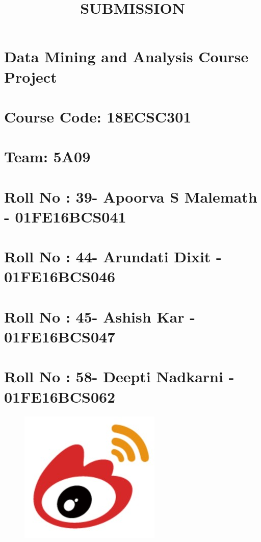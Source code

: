 \documentclass[11pt]{article}
\title{SUBMISSION}
\makeatletter
\def\maxwidth{\ifdim\Gin@nat@width>\linewidth\linewidth
    \else\Gin@nat@width\fi}
\let\Oldincludegraphics\includegraphics
\renewcommand{\includegraphics}[1]{\Oldincludegraphics[width=.8\maxwidth]{#1}}
\makeatother
\begin{document}
    
    
    \maketitle
    
    

    
    \section{Data Mining and Analysis Course
Project}\label{data-mining-and-analysis-course-project}

\section{Course Code: 18ECSC301}\label{course-code-18ecsc301}

\section{Team: 5A09}\label{team-5a09}

\section{Roll No : 39- Apoorva S Malemath -
01FE16BCS041}\label{roll-no-39--apoorva-s-malemath---01fe16bcs041}

\section{Roll No : 44- Arundati Dixit -
01FE16BCS046}\label{roll-no-44--arundati-dixit---01fe16bcs046}

\section{Roll No : 45- Ashish Kar -
01FE16BCS047}\label{roll-no-45--ashish-kar---01fe16bcs047}

\section{Roll No : 58- Deepti Nadkarni -
01FE16BCS062}\label{roll-no-58--deepti-nadkarni---01fe16bcs062}

\begin{figure}
\centering
\includegraphics{weibo.jpg}
\caption{}
\end{figure}
\end{document}
